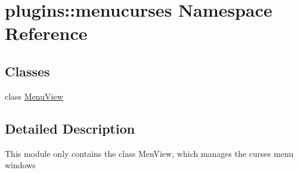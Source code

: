 \hypertarget{namespaceplugins_1_1menucurses}{\section{plugins\-:\-:menucurses \-Namespace \-Reference}
\label{namespaceplugins_1_1menucurses}
}
\subsection*{\-Classes}
\begin{DoxyCompactItemize}
\item 
class \hyperlink{classplugins_1_1menucurses_1_1_menu_view}{\-Menu\-View}
\end{DoxyCompactItemize}


\subsection{\-Detailed \-Description}
\begin{DoxyVerb}
    This module only contains the class MenView,
    which manages the curses menu windows
\end{DoxyVerb}
 